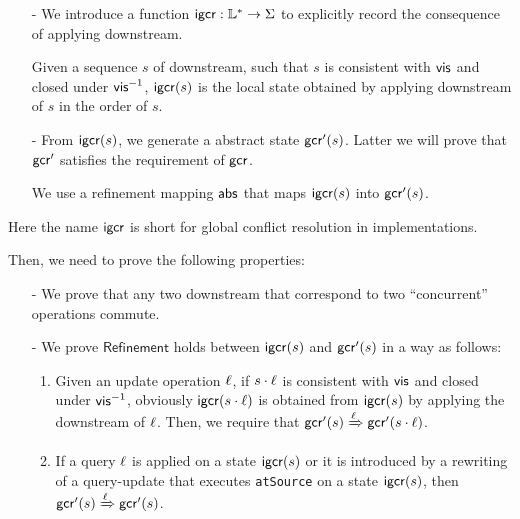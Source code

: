 {\begin{itemize}
\setlength{\itemsep}{0.5pt}
\item[-] We introduce a function $\mathsf{igcr}: \mathbb{L}^* \rightarrow \Sigma$ to explicitly record the consequence of applying downstream.

Given a sequence $s$ of downstream, such that $s$ is consistent with $\mathsf{vis}$ and closed under $\mathsf{vis}^{-1}$, $\mathsf{igcr}(s)$ is the local state obtained by applying downstream of $s$ in the order of $s$.

\item[-] From $\mathsf{igcr}(s)$, we generate a abstract state $\mathsf{gcr}'(s)$. Latter we will prove that $\mathsf{gcr}'$ satisfies the requirement of $\mathsf{gcr}$.

    We use a refinement mapping $\mathsf{abs}$ that maps $\mathsf{igcr}(s)$ into $\mathsf{gcr}'(s)$. %
\end{itemize}


Here the name $\mathsf{igcr}$ is short for global conflict resolution in implementations.

Then, we need to prove the following properties:

\begin{itemize}
\setlength{\itemsep}{0.5pt}
\item[-] We prove that any two downstream that correspond to two ``concurrent'' operations commute.

\item[-] We prove $\mathsf{Refinement}$ holds between $\mathsf{igcr}(s)$ and $\mathsf{gcr}'(s)$ in a way as follows:

\begin{enumerate}
\item Given an update operation $\ell$, if $s \cdot \ell$ is consistent with $\mathsf{vis}$ and closed under $\mathsf{vis}^{-1}$, obviously $\mathsf{igcr}(s \cdot \ell)$ is obtained from $\mathsf{igcr}(s)$ by applying the downstream of $\ell$. Then, we require that $\mathsf{gcr}'(s)\xRightarrow{\ensuremath{\ell}}\mathsf{gcr}'(s \cdot \ell)$.

\item If a query $\ell$ is applied on a state $\mathsf{igcr}(s)$ or it is introduced by a rewriting of a query-update that executes \lstinline|atSource| on a state $\mathsf{igcr}(s)$, then $\mathsf{gcr}'(s)\xRightarrow{\ensuremath{\ell}}\mathsf{gcr}'(s)$.
\end{enumerate}
\end{itemize}

}
